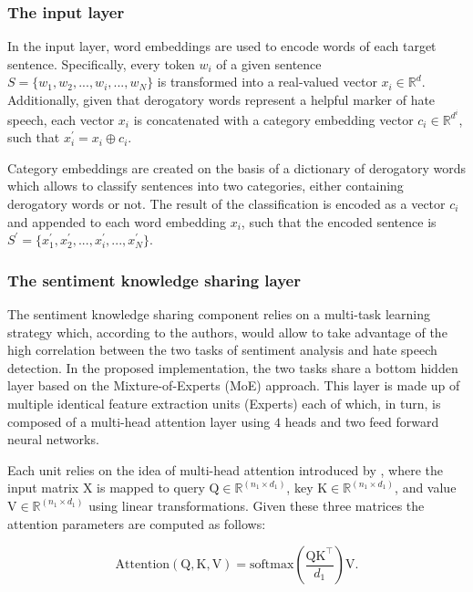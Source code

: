 \subsubsection{The input layer}
    In the input layer, word embeddings are used to encode words of each target sentence. Specifically, every token $w_i$ of a given sentence $S = \{w_1, w_2, ..., w_i, ..., w_N\}$ is transformed into a real-valued vector $x_i \in \mathbb{R}^d$. Additionally, given that derogatory words represent a helpful marker of hate speech, each vector $x_i$ is concatenated with a category embedding vector $c_i \in \mathbb{R}^{d^i}$, such that $x_i^{'} = x_i \oplus c_i$.
    
    Category embeddings are created on the basis of a dictionary of derogatory words which allows to classify sentences into two categories, either containing derogatory words or not. The result of the classification is encoded as a vector $c_i$ and appended to each word embedding $x_i$, such that the encoded sentence is $S^{'} = \{x_1^{'}, x_2^{'}, ..., x_i^{'}, ..., x_N^{'}\}$.


\subsubsection{The sentiment knowledge sharing layer}
    The sentiment knowledge sharing component relies on a multi-task learning strategy which, according to the authors, would allow to take advantage of the high correlation between the two tasks of sentiment analysis and hate speech detection. In the proposed implementation, the two tasks share a bottom hidden layer based on the Mixture-of-Experts (MoE) approach. This layer is made up of multiple identical feature extraction units (Experts) each of which, in turn, is composed of a multi-head attention layer using $4$ heads and two feed forward neural networks.
    
    Each unit relies on the idea of multi-head attention introduced by \citeauthor{vaswani:attention}  \cite{vaswani:attention}, where the input matrix $\mathrm{X}$ is mapped to query $\mathrm{Q} \in \mathbb{R}^{(n_1 \times d_1)}$, key $\mathrm{K} \in \mathbb{R}^{(n_1 \times d_1)}$, and value $\mathrm{V} \in \mathbb{R}^{(n_1 \times d_1)}$ using linear transformations. Given these three matrices the attention parameters are computed as follows:
    
    \begin{equation}
        \mathrm{Attention(Q,K,V)} = \mathrm{softmax}\left( \frac{\mathrm{QK}^\top}{d_1} \right)\mathrm{V}.
    \end{equation}
    
